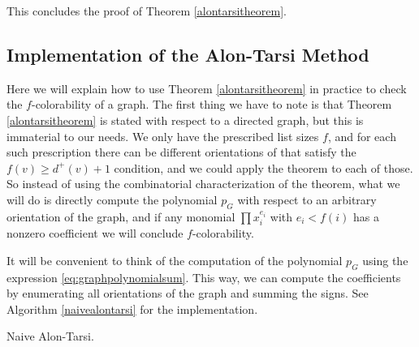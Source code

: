 This concludes the proof of Theorem \ref{alontarsitheorem}.

\subsection{Implementation of the Alon-Tarsi Method}

Here we will explain how to use Theorem \ref{alontarsitheorem} in practice to check the $f$-colorability of a graph.  The first thing we have to note
is that Theorem \ref{alontarsitheorem} is stated with respect to a directed graph, but this is immaterial to our needs. We only have the prescribed
list sizes $f$, and for each such prescription there can be different orientations of that satisfy the $f(v) \geq d^+(v) + 1$ condition, 
and we could apply the theorem to each of those. So instead of using the combinatorial characterization of the theorem, what we will
do is directly compute the polynomial $p_G$ with respect to an arbitrary orientation of the graph, and if any monomial $\prod x_i^{e_i}$ with 
$e_i < f(i)$ has a nonzero coefficient we will conclude $f$-colorability. 

It will be convenient to think of the computation of the polynomial $p_G$ using the expression \eqref{eq:graphpolynomialsum}. This way, we can compute the 
coefficients by enumerating all orientations of the graph and summing the signs.  See
Algorithm \ref{naivealontarsi} for the implementation.

\begin{algorithm}
\caption{Naive Alon-Tarsi.}
\label{naivealontarsi}
\SetAlgoLined
{}
\end{algorithm}


